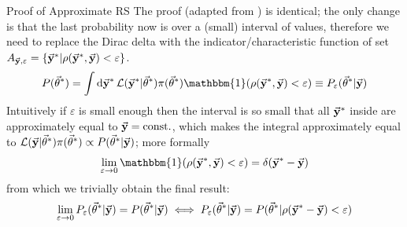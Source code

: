 \documentclass{beamer}
\theoremstyle{remark}
\renewcommand{\L}{\mathcal{L}}
\begin{document}
\begin{frame}{Proof of Approximate RS}
The proof (adapted from \cite{abc_slides}) is identical; the only change is that the last probability now is over a (small) interval of values, therefore we need to replace the Dirac delta with the indicator/characteristic function of set $A_{\va{y},\varepsilon} = \{\va{y}^*|\rho(\va{y}^*, \va{y}) < \varepsilon\}$.
\begin{equation*}
    P(\va{\theta}^*) = \int\dd{\va{y}^*} \L(\va{y}^*|\va{\theta}^*)\pi(\va{\theta}^*)\mathbbm{1}(\rho(\va{y}^*, \va{y}) < \varepsilon) \equiv P_\varepsilon(\va{\theta}^*|\va{y})
\end{equation*}
Intuitively if $\varepsilon$ is small enough then the interval is so small that all $\va{y}^*$ inside are approximately equal to $\va{y}=\text{const.}$, which makes the integral approximately equal to $\L(\va{y}|\va{\theta}^*)\pi(\va{\theta}^*)\propto P(\va{\theta}^*|\va{y})$; more formally
\begin{equation*}
    \lim_{\varepsilon\to 0} \mathbbm{1}(\rho(\va{y}^*, \va{y}) < \varepsilon) = \delta(\va{y}^*-\va{y})
\end{equation*}
from which we trivially obtain the final result:
\begin{equation*}
    \lim_{\varepsilon\to 0} P_\varepsilon(\va{\theta}^*|\va{y}) = P(\va{\theta}^*|\va{y}) \iff P_\varepsilon(\va{\theta}^*|\va{y}) = P(\va{\theta}^*|\rho(\va{y}^*-\va{y})<\varepsilon)
\end{equation*}
\end{frame}
\end{document}

